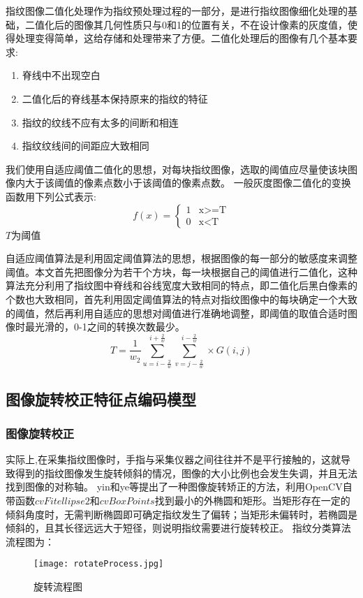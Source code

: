 \documentclass[withoutpreface,bwprint]{cumcmthesis} %
\begin{document}
指纹图像二值化处理作为指纹预处理过程的一部分，是进行指纹图像细化处理的基础，二值化后的图像其几何性质只与0和1的位置有关，不在设计像素的灰度值，使得处理变得简单，这给存储和处理带来了方便。二值化处理后的图像有几个基本要求:
\begin{enumerate}
	\item  脊线中不出现空白
	\item 二值化后的脊线基本保持原来的指纹的特征
	\item 指纹的纹线不应有太多的间断和相连
	\item 指纹纹线间的间距应大致相同
\end{enumerate}
我们使用自适应阈值二值化的思想，对每块指纹图像，选取的阈值应尽量使该块图像内大于该阈值的像素点数小于该阈值的像素点数。
一般灰度图像二值化的变换函数用下列公式表示:
\begin{equation}
f(x)=
\begin{cases}
1& \text{x>=T}\\
0& \text{x<T}
\end{cases}
\end{equation}
$T$为阈值\par
自适应阈值算法是利用固定阈值算法的思想，根据图像的每一部分的敏感度来调整阈值。本文首先把图像分为若干个方块，每一块根据自己的阈值进行二值化，这种算法充分利用了指纹图中脊线和谷线宽度大致相同的特点，即二值化后黑白像素的个数也大致相同，首先利用固定阈值算法的特点对指纹图像中的每块确定一个大致的阈值，然后再利用自适应的思想对阈值进行准确地调整，即阈值的取值合适时图像时最光滑的，0-1之间的转换次数最少。
$$ T=\frac{1}{w_{2}}\sum_{u=i-\frac{2}{w}}^{i+\frac{2}{w}}\sum_{v=j-\frac{2}{w}}^{i-\frac{2}{w}}\times G(i,j)$$

\subsection{图像旋转校正特征点编码模型}
\subsubsection{图像旋转校正}
实际上,在采集指纹图像时，手指与采集仪器之间往往并不是平行接触的，这就导致得到的指纹图像发生旋转倾斜的情况，图像的大小比例也会发生失调，并且无法找到图像的对称轴。
yin和ye等提出了一种图像旋转矫正的方法\cite{尹婉琳2014指纹图像的旋转校正与分类}，利用OpenCV自带函数$cvFitellipse2$和$cvBoxPoints$找到最小的外椭圆和矩形。当矩形存在一定的倾斜角度时，无需判断椭圆即可确定指纹发生了偏转；当矩形未偏转时，若椭圆是倾斜的，且其长径远远大于短径，则说明指纹需要进行旋转校正。
指纹分类算法流程图为：
\begin{figure}[!h]
	\centering
	\texttt{[image: rotateProcess.jpg]}
	\caption{旋转流程图}
\end{figure}
\end{document}
